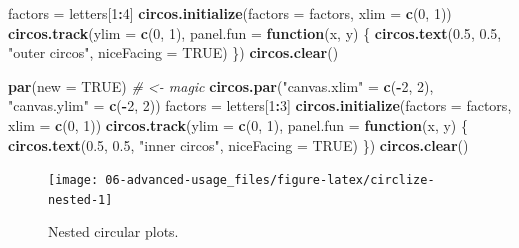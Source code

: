 \documentclass[]{book}
\newenvironment{Shaded}{\begin{snugshade}}{\end{snugshade}}
\newcommand{\KeywordTok}[1]{\textcolor[rgb]{0.13,0.29,0.53}{\textbf{#1}}}
\newcommand{\DataTypeTok}[1]{\textcolor[rgb]{0.13,0.29,0.53}{#1}}
\newcommand{\DecValTok}[1]{\textcolor[rgb]{0.00,0.00,0.81}{#1}}
\newcommand{\FloatTok}[1]{\textcolor[rgb]{0.00,0.00,0.81}{#1}}
\newcommand{\StringTok}[1]{\textcolor[rgb]{0.31,0.60,0.02}{#1}}
\newcommand{\CommentTok}[1]{\textcolor[rgb]{0.56,0.35,0.01}{\textit{#1}}}
\newcommand{\OtherTok}[1]{\textcolor[rgb]{0.56,0.35,0.01}{#1}}
\newcommand{\ControlFlowTok}[1]{\textcolor[rgb]{0.13,0.29,0.53}{\textbf{#1}}}
\newcommand{\OperatorTok}[1]{\textcolor[rgb]{0.81,0.36,0.00}{\textbf{#1}}}
\newcommand{\NormalTok}[1]{#1}
\begin{document}
\begin{Shaded}
\begin{Highlighting}[]
\NormalTok{factors =}\StringTok{ }\NormalTok{letters[}\DecValTok{1}\OperatorTok{:}\DecValTok{4}\NormalTok{]}
\KeywordTok{circos.initialize}\NormalTok{(}\DataTypeTok{factors =}\NormalTok{ factors, }\DataTypeTok{xlim =} \KeywordTok{c}\NormalTok{(}\DecValTok{0}\NormalTok{, }\DecValTok{1}\NormalTok{))}
\KeywordTok{circos.track}\NormalTok{(}\DataTypeTok{ylim =} \KeywordTok{c}\NormalTok{(}\DecValTok{0}\NormalTok{, }\DecValTok{1}\NormalTok{), }\DataTypeTok{panel.fun =} \ControlFlowTok{function}\NormalTok{(x, y) \{}
    \KeywordTok{circos.text}\NormalTok{(}\FloatTok{0.5}\NormalTok{, }\FloatTok{0.5}\NormalTok{, }\StringTok{"outer circos"}\NormalTok{, }\DataTypeTok{niceFacing =} \OtherTok{TRUE}\NormalTok{)}
\NormalTok{\})}
\KeywordTok{circos.clear}\NormalTok{()}

\KeywordTok{par}\NormalTok{(}\DataTypeTok{new =} \OtherTok{TRUE}\NormalTok{) }\CommentTok{# <- magic}
\KeywordTok{circos.par}\NormalTok{(}\StringTok{"canvas.xlim"}\NormalTok{ =}\StringTok{ }\KeywordTok{c}\NormalTok{(}\OperatorTok{-}\DecValTok{2}\NormalTok{, }\DecValTok{2}\NormalTok{), }\StringTok{"canvas.ylim"}\NormalTok{ =}\StringTok{ }\KeywordTok{c}\NormalTok{(}\OperatorTok{-}\DecValTok{2}\NormalTok{, }\DecValTok{2}\NormalTok{))}
\NormalTok{factors =}\StringTok{ }\NormalTok{letters[}\DecValTok{1}\OperatorTok{:}\DecValTok{3}\NormalTok{]}
\KeywordTok{circos.initialize}\NormalTok{(}\DataTypeTok{factors =}\NormalTok{ factors, }\DataTypeTok{xlim =} \KeywordTok{c}\NormalTok{(}\DecValTok{0}\NormalTok{, }\DecValTok{1}\NormalTok{))}
\KeywordTok{circos.track}\NormalTok{(}\DataTypeTok{ylim =} \KeywordTok{c}\NormalTok{(}\DecValTok{0}\NormalTok{, }\DecValTok{1}\NormalTok{), }\DataTypeTok{panel.fun =} \ControlFlowTok{function}\NormalTok{(x, y) \{}
    \KeywordTok{circos.text}\NormalTok{(}\FloatTok{0.5}\NormalTok{, }\FloatTok{0.5}\NormalTok{, }\StringTok{"inner circos"}\NormalTok{, }\DataTypeTok{niceFacing =} \OtherTok{TRUE}\NormalTok{)}
\NormalTok{\})}
\KeywordTok{circos.clear}\NormalTok{()}
\end{Highlighting}
\end{Shaded}

\begin{figure}

{\centering \texttt{[image: 06-advanced-usage\_files/figure-latex/circlize-nested-1]} 

}

\caption{Nested circular plots.}\label{fig:circlize-nested}
\end{figure}
\end{document}
